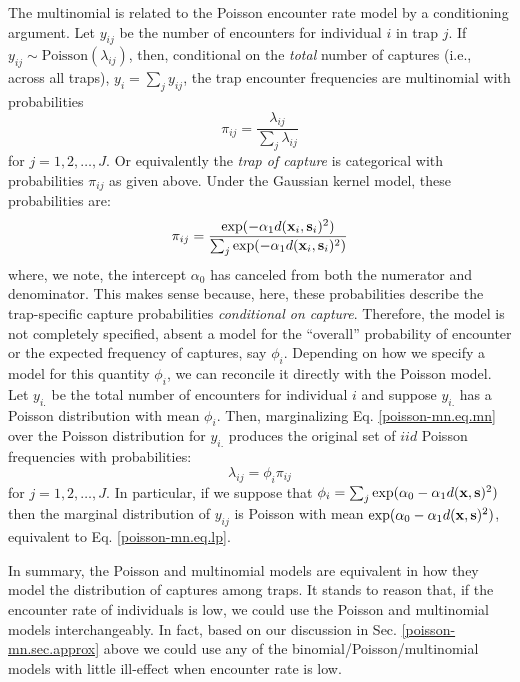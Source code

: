 The multinomial is related to the Poisson encounter rate model by a
conditioning argument. Let $y_{ij}$ be the number of encounters for
individual $i$ in trap $j$. If $y_{ij} \sim
\mbox{Poisson}(\lambda_{ij})$, then, conditional on the {\it total}
number of captures (i.e., across all traps), $y_{i} = \sum_{j}
y_{ij}$, the trap encounter frequencies are multinomial with
probabilities
\[
 \pi_{ij} =  \frac{ \lambda_{ij} } { \sum_{j} \lambda_{ij} }
\]
for $j=1,2,\ldots,J$.
Or equivalently the {\it trap of
  capture} is categorical with probabilities $\pi_{ij}$ as given above.
Under the Gaussian kernel model, these probabilities are:
\begin{equation}
\pi_{ij} =  \frac{ \exp(  -\alpha_{1}  d({\bf x}_{i},{\bf s}_{i})^2 ) }  {
   \sum_{j} \exp( -\alpha_{1} d({\bf x}_{i},{\bf s}_{i})^2)}
\label{poisson-mn.eq.mnprobs}
\end{equation}
where, we note, the intercept $\alpha_{0}$ has canceled from both the
numerator and denominator. This makes sense because, here, these
probabilities describe the trap-specific capture probabilities {\it
  conditional on capture}.  Therefore, the model is not completely
specified, absent a model for the ``overall'' probability of encounter
or the expected frequency of captures, say $\phi_{i}$. Depending on
how we specify a model for this quantity $\phi_{i}$, we can reconcile
it directly with the Poisson model.  Let $y_{i.}$ be the total number
of encounters for individual $i$ and suppose $y_{i.}$ has a Poisson
distribution with mean $\phi_{i}$.  Then, marginalizing
Eq. \ref{poisson-mn.eq.mn} over the Poisson distribution for $y_{i.}$
produces the original set of $iid$ Poisson frequencies with
probabilities:
\[
 \lambda_{ij} = \phi_{i} \pi_{ij}
\]
for $j=1,2,\ldots,J$.  In particular, if we suppose that $\phi_{i} =
\sum_{j} \exp(\alpha_{0} - \alpha_{1} d({\bf x},{\bf s})^2)$ then the
marginal distribution of $y_{ij}$ is Poisson with mean $\exp(
\alpha_{0} - \alpha_{1} d({\bf x},{\bf s})^2 )$, equivalent to
Eq. \ref{poisson-mn.eq.lp}.


In summary, the Poisson and multinomial models are equivalent in how
they model the distribution of captures among traps.
 It stands to reason that, if the encounter
rate of individuals is low, we could use the Poisson and multinomial
models interchangeably. In fact, based on our discussion in Sec.
\ref{poisson-mn.sec.approx}
above we could use any of the binomial/Poisson/multinomial models with
little ill-effect when encounter rate is low.





